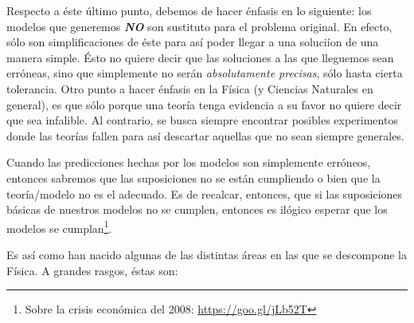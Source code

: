Respecto a \'este \'ultimo punto, debemos de hacer \'enfasis en lo siguiente: los modelos que generemos \textbf{\emph{NO}} son sustituto para el problema original. En efecto, s\'olo son simplificaciones de \'este para as\'i poder llegar a una soluci\'ion de una manera simple. \'Esto no quiere decir que las soluciones a las que lleguemos sean err\'oneas, sino que simplemente no ser\'an \emph{absolutamente precisas}, s\'olo hasta cierta tolerancia. Otro punto a hacer \'enfasis en la F\'isica (y Ciencias Naturales en general), es que s\'olo porque una teor\'ia tenga evidencia a su favor no quiere decir que sea infalible. Al contrario, se busca siempre encontrar posibles experimentos donde las teor\'ias fallen para as\'i descartar aquellas que no sean siempre generales. 

Cuando las predicciones hechas por los modelos son simplemente err\'oneos, entonces sabremos que las suposiciones no se est\'an cumpliendo o bien que la teor\'ia/modelo no es el adecuado. Es de recalcar, entonces, que si las suposiciones b\'asicas de nuestros modelos no se cumplen, entonces es il\'ogico esperar que los modelos se cumplan\footnote{Sobre la crisis econ\'omica del 2008: \href{https://goo.gl/jLb52T}{https://goo.gl/jLb52T}}.

Es as\'i como han nacido algunas de las distintas \'areas en las que se descompone la F\'isica. A grandes rasgos, \'estas son:

